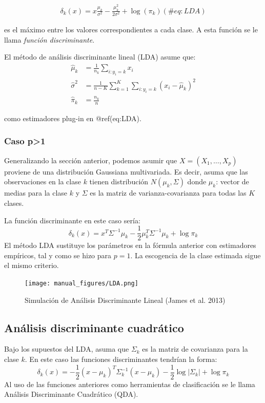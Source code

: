 \documentclass[
  12pt,
]{book}
\begin{document}
\begin{align}
\delta_k(x)=x\frac{\mu_k}{\sigma^2}-\frac{\mu_k^2}{2\sigma^2}+\log(\pi_k)
(\#eq:LDA)
\end{align}

es el máximo entre los valores correspondientes a cada clase. A esta
función se le llama \emph{función discriminante}.

El método de análisis discriminante lineal (LDA) asume que:
\begin{align*}
\hat \mu_k&=\frac{1}{n_k}\sum_{i:y_i=k}x_i\\
\hat \sigma^2&=\frac{1}{n-K}\sum_{k=1}^K\sum_{i:y_i=k}(x_i-\hat \mu_k)^2\\
\hat \pi_k &=\frac{n_k}{n}
\end{align*}

como estimadores plug-in en @ref(eq:LDA).

\hypertarget{caso-p1-1}{%
\subsubsection{Caso p\textgreater1}\label{caso-p1-1}}

Generalizando la sección anterior, podemos asumir que
\(X=(X_1,\ldots,X_p)\) proviene de una distribución Gaussiana
multivariada. Es decir, asuma que las observaciones en la clase \(k\)
tienen distribución \(N(\mu_k,\Sigma)\) donde \(\mu_k\): vector de
medias para la clase \(k\) y \(\Sigma\) es la matriz de
varianza-covarianza para todas las \(K\) clases.

La función discriminante en este caso sería:
\[\delta_k(x)=x^T\Sigma^{-1} \mu_k-\frac 1 2\mu_k^T \Sigma^{-1}\mu_k+\log \pi_k\]
El método LDA sustituye los parámetros en la fórmula anterior con
estimadores empíricos, tal y como se hizo para \(p=1\). La escogencia de
la clase estimada sigue el mismo criterio.

\begin{figure}
\centering
\texttt{[image: manual\_figures/LDA.png]}
\caption{Simulación de Análisis Discriminante Lineal (James et al.
2013)}
\end{figure}

\hypertarget{anuxe1lisis-discriminante-cuadruxe1tico}{%
\subsection{Análisis discriminante
cuadrático}\label{anuxe1lisis-discriminante-cuadruxe1tico}}

Bajo los supuestos del LDA, asuma que \(\Sigma_k\) es la matriz de
covarianza para la clase \(k\). En este caso las funciones
discriminantes tendrían la forma:
\[\delta_k(x)=-\frac 1 2 (x-\mu_k)^T\Sigma_k^{-1}(x-\mu_k)-\frac 1 2 \log |\Sigma_k|+\log \pi_k\]
Al uso de las funciones anteriores como herramientas de clasificación se
le llama Análisis Discriminante Cuadrático (QDA).
\end{document}
